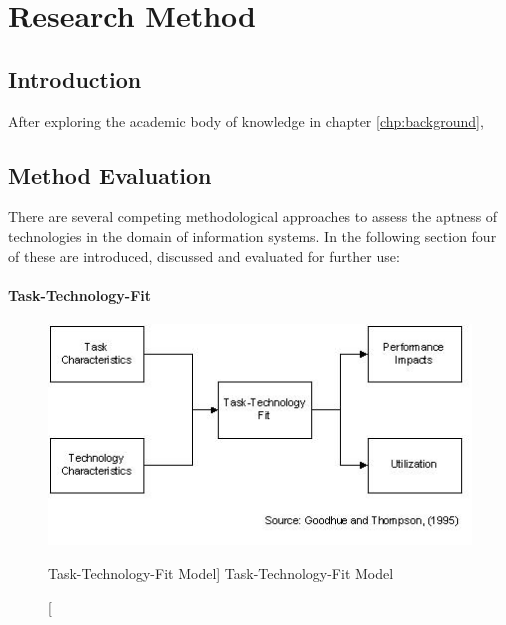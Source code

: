 \chapter{Research Method}


\section{Introduction}

After exploring the academic body of knowledge in chapter \ref{chp:background}, 


\section{Method Evaluation}

There are several competing methodological approaches to assess the aptness of technologies in the domain of information systems. In the following section four of these are introduced, discussed and evaluated for further use:

    
    \subsubsection{Task-Technology-Fit}
    \begin{figure}[ht]
        \includegraphics[width=0.7\linewidth]{images/methodology/ttf.jpg}\centering
        \caption
        [Task-Technology-Fit Model]
        {Task-Technology-Fit Model \cite{Goodhue1995Task-TechnologyPerformance}}
    \end{figure}
    
